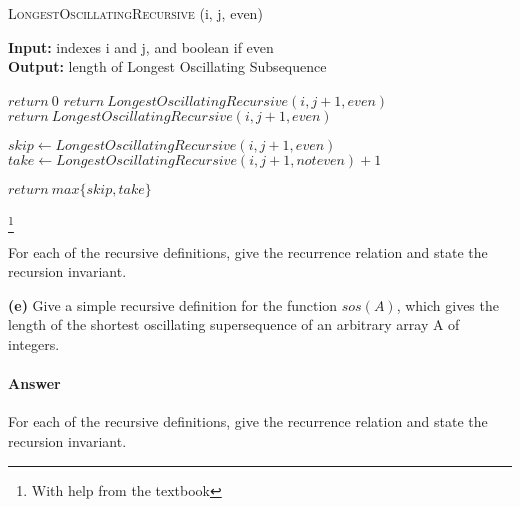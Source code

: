 \documentclass{article}
\begin{document}
\begin{algorithm} \caption{\textsc{LongestOscillatingRecursive} (i, j, even)}\label{alg:seb}
    {\bf Input:} indexes i and j, and boolean if even\\
    {\bf Output:} length of Longest Oscillating Subsequence
    \begin{algorithmic}[1]
            \State$return\ 0$
                \State$return\ LongestOscillatingRecursive(i, j+1, even)$
            \EndIf{}
        \Else{}
                \State$return\ LongestOscillatingRecursive(i, j+1, even)$
            \EndIf{}
        \EndIf{}

        \State$skip \gets LongestOscillatingRecursive(i, j+1, even)$
        \State$take \gets LongestOscillatingRecursive(i, j+1, not even) +1$

        \State$return\ max\{skip, take\}$
    \end{algorithmic}
\end{algorithm}

\footnote{With help from the textbook}





\todo{}



For each of the recursive definitions, give the recurrence
relation and state the recursion invariant.

{\bf (e)} Give a simple recursive definition for the function $sos(A)$, which gives
the length of the shortest oscillating supersequence of an arbitrary array
A of integers.

\paragraph{Answer}

\todo{}



For each of the recursive definitions, give the recurrence
relation and state the recursion invariant.
\end{document}
